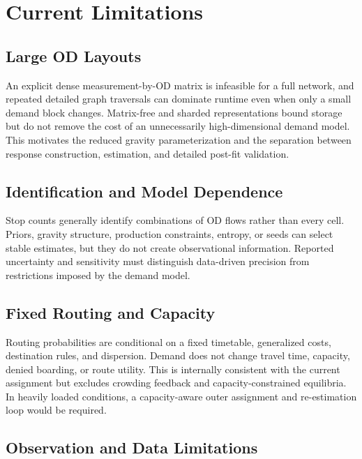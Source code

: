 
\section{Current Limitations}
\subsection{Large OD Layouts}

An explicit dense measurement-by-OD matrix is infeasible for a full network,
and repeated detailed graph traversals can dominate runtime even when only a
small demand block changes. Matrix-free and sharded representations bound
storage but do not remove the cost of an unnecessarily high-dimensional demand
model. This motivates the reduced gravity parameterization and the separation
between response construction, estimation, and detailed post-fit validation.

\subsection{Identification and Model Dependence}

Stop counts generally identify combinations of OD flows rather than every
cell. Priors, gravity structure, production constraints, entropy, or seeds can
select stable estimates, but they do not create observational information.
Reported uncertainty and sensitivity must distinguish data-driven precision
from restrictions imposed by the demand model.

\subsection{Fixed Routing and Capacity}

Routing probabilities are conditional on a fixed timetable, generalized costs,
destination rules, and dispersion. Demand does not change travel time,
capacity, denied boarding, or route utility. This is internally consistent with
the current assignment but excludes crowding feedback and capacity-constrained
equilibria. In heavily loaded conditions, a capacity-aware outer assignment and
re-estimation loop would be required.

\subsection{Observation and Data Limitations}

